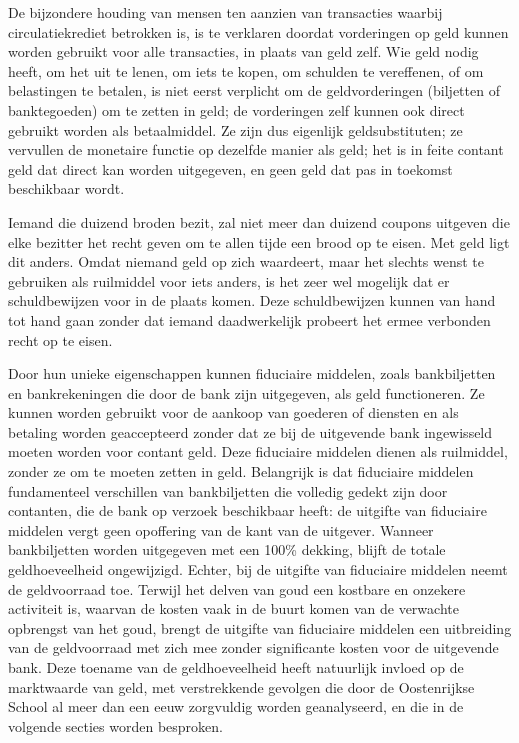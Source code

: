 \begin{blockquotebox}
    De bijzondere houding van mensen ten aanzien van transacties waarbij circulatiekrediet betrokken is, is te verklaren doordat vorderingen op geld kunnen worden gebruikt voor alle transacties, in plaats van geld zelf. Wie geld nodig heeft, om het uit te lenen, om iets te kopen, om schulden te vereffenen, of om belastingen te betalen, is niet eerst verplicht om de geldvorderingen (biljetten of banktegoeden) om te zetten in geld; de vorderingen zelf kunnen ook direct gebruikt worden als betaalmiddel. Ze zijn dus eigenlijk geldsubstituten; ze vervullen de monetaire functie op dezelfde manier als geld; het is in feite contant geld dat direct kan worden uitgegeven, en geen geld dat pas in toekomst beschikbaar wordt.
    \par\vspace{1em}\noindent
    Iemand die duizend broden bezit, zal niet meer dan duizend coupons uitgeven die elke bezitter het recht geven om te allen tijde een brood op te eisen. Met geld ligt dit anders. Omdat niemand geld op zich waardeert, maar het slechts wenst te gebruiken als ruilmiddel voor iets anders, is het zeer wel mogelijk dat er schuldbewijzen voor in de plaats komen. Deze schuldbewijzen kunnen van hand tot hand gaan zonder dat iemand daadwerkelijk probeert het ermee verbonden recht op te eisen.\footnotemark
\end{blockquotebox}
\autocite{167}

Door hun unieke eigenschappen kunnen fiduciaire middelen, zoals bankbiljetten en bankrekeningen die door de bank zijn uitgegeven, als geld functioneren. Ze kunnen worden gebruikt voor de aankoop van goederen of diensten en als betaling worden geaccepteerd zonder dat ze bij de uitgevende bank ingewisseld moeten worden voor contant geld. Deze fiduciaire middelen dienen als ruilmiddel, zonder ze om te moeten zetten in geld. Belangrijk is dat fiduciaire middelen fundamenteel verschillen van bankbiljetten die volledig gedekt zijn door contanten, die de bank op verzoek beschikbaar heeft: de uitgifte van fiduciaire middelen vergt geen opoffering van de kant van de uitgever. Wanneer bankbiljetten worden uitgegeven met een 100\% dekking, blijft de totale geldhoeveelheid ongewijzigd. Echter, bij de uitgifte van fiduciaire middelen neemt de geldvoorraad toe. Terwijl het delven van goud een kostbare en onzekere activiteit is, waarvan de kosten vaak in de buurt komen van de verwachte opbrengst van het goud, brengt de uitgifte van fiduciaire middelen een uitbreiding van de geldvoorraad met zich mee zonder significante kosten voor de uitgevende bank. Deze toename van de geldhoeveelheid heeft natuurlijk invloed op de marktwaarde van geld, met verstrekkende gevolgen die door de Oostenrijkse School al meer dan een eeuw zorgvuldig worden geanalyseerd, en die in de volgende secties worden besproken.

